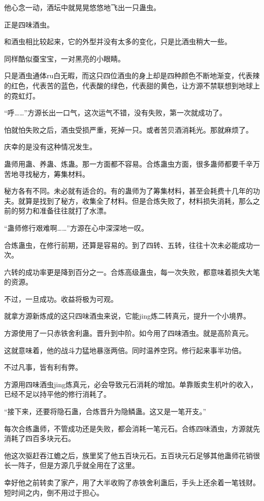 \begin{this_body}
他心念一动，酒坛中就晃晃悠悠地飞出一只蛊虫。

正是四味酒虫。

和酒虫相比较起来，它的外型并没有太多的变化，只是比酒虫稍大一些。

同样酷似蚕宝宝，一对黑亮的小眼睛。

只是酒虫通体ru白无暇，而这只四位酒虫的身上却是四种颜色不断地渐变，代表辣的红色，代表苦的蓝色，代表酸的绿色，代表甜的黄色，让方源不禁联想到地球上的霓虹灯。

“呼……”方源长出一口气，这次运气不错，没有失败，第一次就成功了。

怕就怕失败之后，酒虫受损严重，死掉一只。或者苦贝酒消耗光。那就麻烦了。

庆幸的是没有这种情况发生。

蛊师用蛊、养蛊、炼蛊。那一方面都不容易。合炼蛊虫方面，很多蛊师都要千辛万苦地寻找秘方，筹集材料。

秘方各有不同。未必就有适合的。有的蛊师为了筹集材料，甚至会耗费十几年的功夫。就算是找到了秘方，收集全了材料。但是合炼失败了，材料损失消耗，那么之前的努力和准备往往就打了水漂。

“蛊师修行艰难啊……”方源在心中深深地一叹。

合炼蛊虫，在修行前期，还算是容易的。到了四转、五转，往往十次未必能成功一次。

六转的成功率更是降到百分之一。合炼高级蛊虫，每一次失败，都意味着损失大笔的资源。

不过，一旦成功。收益将极为可观。

就拿方源新炼成的这只四味酒虫来说，它能jing炼二转真元，提升一个小境界。

方源使用了一只赤铁舍利蛊。晋升到中阶。如今用了四味酒虫。就是高阶真元。

这就意味着，他的战斗力猛地暴涨两倍。同时温养空窍。修行起来事半功倍。

不过凡事，皆有利有弊。

方源用四味酒虫jing炼真元，必会导致元石消耗的增加。单靠贩卖生机叶的收入，已经不足以持平他的修行消耗了。

“接下来，还要将隐石蛊，合炼晋升为隐鳞蛊。这又是一笔开支。”

每次合练蛊师，不管成功还是失败，都会消耗一笔元石。合练四味酒虫，方源就先消耗了四百多块元石。

他这次驱赶吞江蟾之后，族里奖了他五百块元石。五百块元石足够其他蛊师花销很长一阵子，但是方源几乎就全用在了这里。

幸好他之前转卖了家产，用了大半收购了赤铁舍利蛊后，手头上还余着一笔钱财。短时间之内，倒不用过于担心。


\end{this_body}
